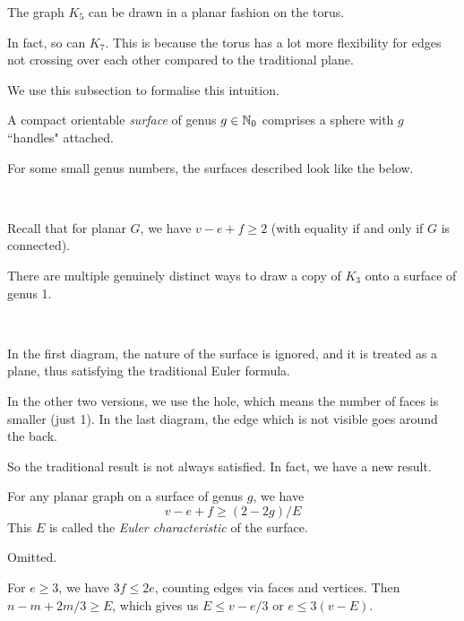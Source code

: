 \documentclass{article}
\begin{document}
The graph $K_5$ can be drawn in a planar fashion on the torus.


In fact, so can $K_7$. This is because the torus has a lot more flexibility for edges not crossing over each other compared to the traditional plane.

We use this subsection to formalise this intuition.

\begin{definition}[Surface]
    A compact orientable \textit{surface} of genus $g \in \mathbb{N}_0$ comprises a sphere with $g$ ``handles" attached.
\end{definition}

For some small genus numbers, the surfaces described look like the below.

 \

Recall that for planar $G$, we have $v - e + f \geq 2$ (with equality if and only if $G$ is connected).

\begin{example}
    There are multiple genuinely distinct ways to draw a copy of $K_3$ onto a surface of genus 1.
    
     \
    
    In the first diagram, the nature of the surface is ignored, and it is treated as a plane, thus satisfying the traditional Euler formula.
    
    In the other two versions, we use the hole, which means the number of faces is smaller (just 1). In the last diagram, the edge which is not visible goes around the back.
\end{example}

So the traditional result is not always satisfied. In fact, we have a new result.

\begin{theorem}
    For any planar graph on a surface of genus $g$, we have
    \[
	v - e + f \geq (2 - 2g)/E
	\]
	This $E$ is called the \textit{Euler characteristic} of the surface.
\end{theorem}

\begin{prf}
    Omitted.
\end{prf}

\begin{note}
	For $e \geq 3$, we have $3f \leq 2e$, counting edges via faces and vertices. Then $n - m + 2m/3 \geq E$, which gives us $E \leq v - e/3$ or $e \leq 3(v - E)$.
\end{note}
\end{document}
